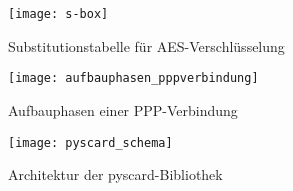   \begin{figure}[htp]
  \begin{center}
   \texttt{[image: s-box]}
  \end{center}
  \caption[Substitutionstabelle für AES-Verschlüsselung]{Substitutionstabelle für AES-Verschlüsselung \cite{paar10}}
  \label{abb:s-box}
 \end{figure}
 
 \begin{figure}[htp]
  \begin{center}
   \texttt{[image: aufbauphasen\_pppverbindung]}
  \end{center}
  \caption[Aufbauphasen einer PPP-Verbindung]{Aufbauphasen einer PPP-Verbindung \cite{zackercomptia}}
  \label{abb:aufbauphasen_pppverbindung}
 \end{figure}

 \begin{figure}[htp]
  \begin{center}
   \texttt{[image: pyscard\_schema]}
  \end{center}
  \caption[Architektur der pyscard-Bibliothek]{Architektur der pyscard-Bibliothek \cite{pyscardweb}}
  \label{abb:pyscard_schema}
 \end{figure}